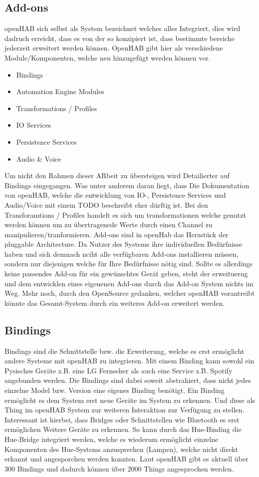 \subsection{Add-ons}
openHAB sich selbst als System bezeichnet welches alles Integriert, dies wird dadruch erreicht, dass es von der so konzipiert ist, dass bestimmte bereiche jederzeit erweitert werden können. OpenHAB gibt hier als verschiedene Module/Komponenten, welche neu hinzugefügt werden können vor.
\begin{itemize}
	\item Bindings
	\item Automation Engine Modules
	\item Transformations / Profiles
	\item IO Services
	\item Persistence Services
	\item Audio \& Voice
\end{itemize}
Um nicht den Rahmen dieser ARbeit zu übersteigen wird Detailierter auf Bindings eingegangen. Was unter anderem daran liegt, dass Die Dokumentation von openHAB, welche die entwicklung von IO-, Persistence Services und Audio/Voice mit einem TODO beschreibt eher dürftig ist. Bei den Transforamtions / Profiles handelt es sich um transformationen welche genutzt werden können um zu übertragenede Werte durch einen Channel zu manipulieren/tranformieren.
Add-ons sind in openHab das Herzstück der pluggable Architecture. Da Nutzer des Systems ihre individuellen Bedürfnisse haben und sich demnach nciht alle verfügbaren Add-ons installieren müssen, sondern nur diejenigen welche für Ihre Bedürfnisse nötig sind. Sollte es allerdings keine passendes Add-on für ein gewünschtes Gerät geben, steht der erweituerng und dem entwicklen eines eigenenen Add-ons durch das Add-on System nichts im Weg. Mehr noch, durch den OpenSource gedanken, welcher openHAB vorantreibt könnte das Gesamt-System durch ein weiteres Add-on erweitert werden. 

\subsection{Bindings}
Bindings sind die Schnittstelle bzw. die Erweiterung, welche es erst ermöglicht andere Systeme mit openHAB zu integrieren. Mit einem Binding kann sowohl ein Pysisches Geräte z.B. eine LG Fernseher als auch eine Service z.B. Spotify angebunden werden. Die Bindings sind dabei soweit abstrahiert, dass nicht jedes einzelne Model bzw. Version eine eigenes Binding benötigt.
Ein Binding ermöglicht es dem System erst neue Geräte im System zu erkennen. Und diese als Thing im openHAB System zur weiteren Interaktion zur Verfügung zu stellen. Interessant ist hierbei, dass Bridges oder Schnittstellen wie Bluetooth es erst ermöglichen Weitere Geräte zu erkennen. So kann durch das Hue-Binding die Hue-Bridge integriert werden, welche es wiederum ermöglicht einzelne Komponenten des Hue-Systems anzusprechen (Lampen), welche nicht direkt erkannt und angesporchen werden konnten.
Laut openHAB gibt es aktuell über 300 Bindings und dadurch können über 2000 Things angesprochen werden.

